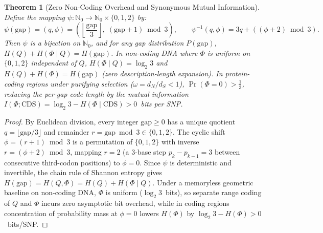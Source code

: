 \documentclass[10pt]{article}
\newtheorem{theorem}{Theorem}
\theoremstyle{definition}
\begin{document}
\begin{theorem}[Zero Non-Coding Overhead and Synonymous Mutual Information]
\label{thm:law2}
Define the mapping $\psi: \mathbb{N}_0 \to \mathbb{N}_0 \times \{0,1,2\}$ by:
\begin{equation}
  \psi(\text{gap}) = (q, \phi) = \left(\left\lfloor \frac{\text{gap}}{3} \right\rfloor,\; (\text{gap} + 1) \bmod 3\right), \qquad \psi^{-1}(q, \phi) = 3q + ((\phi + 2) \bmod 3).
  \label{eq:wobble_map}
\end{equation}
Then $\psi$ is a bijection on $\mathbb{N}_0$, and for any gap distribution $P(\text{gap})$, $H(Q) + H(\Phi \mid Q) = H(\text{gap})$. In non-coding DNA where $\Phi$ is uniform on $\{0,1,2\}$ independent of $Q$, $H(\Phi \mid Q) = \log_2 3$ and $H(Q) + H(\Phi) = H(\text{gap})$ (zero description-length expansion). In protein-coding regions under purifying selection ($\omega = d_N/d_S < 1$), $\Pr(\Phi = 0) > \frac{1}{3}$, reducing the per-gap code length by the mutual information $I(\Phi; \text{CDS}) = \log_2 3 - H(\Phi \mid \text{CDS}) > 0$~bits per SNP.
\end{theorem}
\begin{proof}
By Euclidean division, every integer $\text{gap} \ge 0$ has a unique quotient $q = \lfloor \text{gap}/3 \rfloor$ and remainder $r = \text{gap} \bmod 3 \in \{0,1,2\}$. The cyclic shift $\phi = (r + 1) \bmod 3$ is a permutation of $\{0,1,2\}$ with inverse $r = (\phi + 2) \bmod 3$, mapping $r=2$ (a 3-base step $p_k - p_{k-1} = 3$ between consecutive third-codon positions) to $\phi = 0$. Since $\psi$ is deterministic and invertible, the chain rule of Shannon entropy gives $H(\text{gap}) = H(Q, \Phi) = H(Q) + H(\Phi \mid Q)$. Under a memoryless geometric baseline on non-coding DNA, $\Phi$ is uniform ($\log_2 3$~bits), so separate range coding of $Q$ and $\Phi$ incurs zero asymptotic bit overhead, while in coding regions concentration of probability mass at $\phi=0$ lowers $H(\Phi)$ by $\log_2 3 - H(\Phi) > 0$~bits/SNP.
\end{proof}
\end{document}
